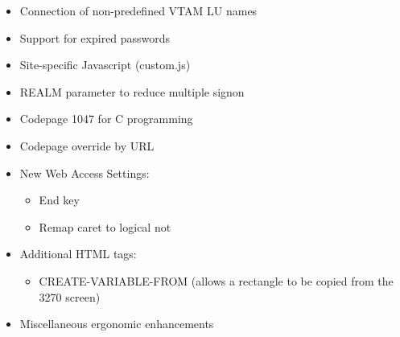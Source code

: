\documentclass[letterpaper,10pt,english]{sphinxmanual}
\begin{document}
\begin{itemize}
\item {} 
Connection of non-predefined VTAM LU names

\item {} 
Support for expired passwords

\item {} 
Site-specific Javascript (custom.js)

\item {} 
REALM parameter to reduce multiple signon

\item {} 
Codepage 1047 for C programming

\item {} 
Codepage override by URL

\item {} 
New Web Access Settings:
\begin{itemize}
\item {} 
End key

\item {} 
Remap caret to logical not

\end{itemize}

\item {} 
Additional HTML tags:
\begin{itemize}
\item {} 
CREATE-VARIABLE-FROM (allows a rectangle to be copied from the 3270 screen)

\end{itemize}

\item {} 
Miscellaneous ergonomic enhancements

\end{itemize}
\end{document}
